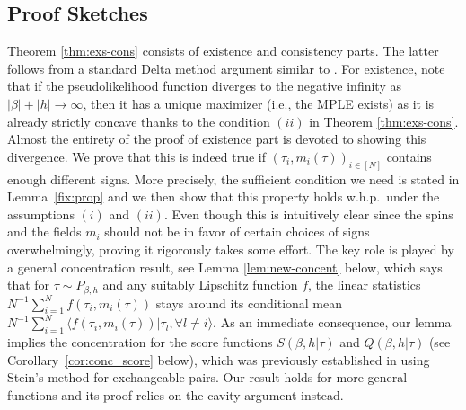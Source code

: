 \documentclass[letterpaper,11pt,reqno]{amsart}
\newcommand{\ra}{\rangle}
\newcommand{\la}{\langle}
\begin{document}
\subsection{Proof Sketches}\label{ssec:pf-idea}
    Theorem \ref{thm:exs-cons} consists of existence and consistency parts. The latter follows from a standard Delta method argument similar to  \cite[Theorem 1.2]{GM20}. For existence, note that if the pseudolikelihood function diverges to the negative infinity as $|\beta|+|h|\to\infty$, then it has a unique maximizer (i.e., the MPLE exists) as it is already strictly concave thanks to the condition $(ii)$ in Theorem \ref{thm:exs-cons}.  Almost the entirety of the proof of existence part is devoted to showing this divergence. We prove that this is indeed true if $(\tau_i,m_i(\tau))_{i\in [N]}$ contains enough different signs. More precisely, the sufficient condition we need is stated in Lemma~\ref{fix:prop} and we then show that this property holds w.h.p.\ under the assumptions $(i)$ and $(ii)$. Even though this is intuitively clear since the spins and the fields $m_i$ should not be in favor of certain choices of signs overwhelmingly, proving it rigorously takes some effort.  The key role is played by a general concentration result, see Lemma \ref{lem:new-concent} below, which says that for $\tau\sim P_{\beta,h}$ and any suitably Lipschitz function $f$, the linear statistics  $N^{-1}\sum_{i=1}^Nf(\tau_i,m_i(\tau))$ stays around its conditional mean $N^{-1}\sum_{i=1}^N\la f(\tau_i,m_i(\tau))|\tau_{l},\forall l\neq i\ra.$ As an immediate consequence, our lemma implies the concentration for the score functions $S(\beta,h|\tau)$ and $Q(\beta,h|\tau)$ (see Corollary~\ref{cor:conc_score} below), which was previously established  in \cite{Chat07} using Stein's method for exchangeable pairs. Our result holds for more general functions and its proof relies on the cavity argument instead.
\end{document}
